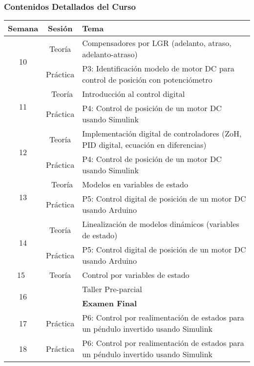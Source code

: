 \documentclass[aspectratio=169,handout]{beamer}
\theoremstyle{definition}
\theoremstyle{plain}
\theoremstyle{remark}
\begin{document}
\begin{frame}[c]\frametitle{Contenidos Detallados del Curso}
\centering
\scriptsize
\begin{tabular}{c|c|p{11cm}}
  \textbf{Semana} & \textbf{Sesión} & \textbf{Tema} \\
  \hline
  \multirow{2}{*}{10} & Teoría     & Compensadores por LGR (adelanto, atraso, adelanto-atraso)\\
                      & Práctica   & P3: Identificación modelo de motor DC para control de posición con potenciómetro \\
  \hline
  \multirow{2}{*}{11} & Teoría     & Introducción al control digital \\
                      & Práctica   & P4: Control de posición de un motor DC usando Simulink \\
  \hline                    
  \multirow{2}{*}{12} & Teoría     & Implementación digital de controladores (ZoH, PID digital, ecuación en diferencias) \\
                      & Práctica   & P4: Control de posición de un motor DC usando Simulink \\
  \hline                      
  \multirow{2}{*}{13} & Teoría     & Modelos en variables de estado \\
                      & Práctica   & P5: Control digital de posición de un motor DC usando Arduino \\
  \hline                    
  \multirow{2}{*}{14} & Teoría     & Linealización de modelos dinámicos (variables de estado) \\
                      & Práctica   & P5: Control digital de posición de un motor DC usando Arduino \\
  \hline                    
  15  & Teoría & Control por variables de estado \\
  \hline                    
  \multirow{2}{*}{16} &            & Taller Pre-parcial \\
                      &            & \textbf{Examen Final} \\
  \hline                    
  17  & Práctica & P6: Control por realimentación de estados para un péndulo invertido usando Simulink \\
  \hline                    
  18  & Práctica & P6: Control por realimentación de estados para un péndulo invertido usando Simulink \\
\end{tabular}
\end{frame}
\end{document}
